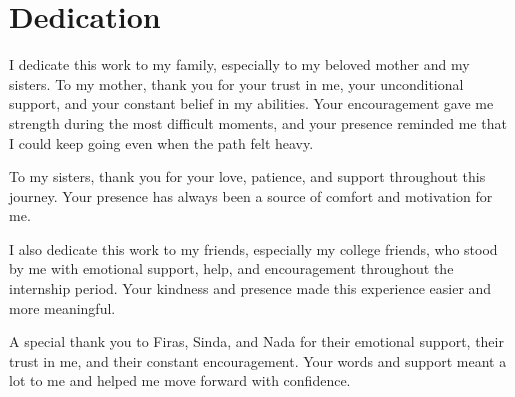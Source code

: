 \section*{Dedication}

\vspace{0.5cm}

I dedicate this work to my family, especially to my beloved mother and my sisters.
To my mother, thank you for your trust in me, your unconditional support, and
your constant belief in my abilities. Your encouragement gave me strength during
the most difficult moments, and your presence reminded me that I could keep going
even when the path felt heavy.

To my sisters, thank you for your love, patience, and support throughout this
journey. Your presence has always been a source of comfort and motivation for me.

I also dedicate this work to my friends, especially my college friends, who stood
by me with emotional support, help, and encouragement throughout the internship
period. Your kindness and presence made this experience easier and more meaningful.

A special thank you to Firas, Sinda, and Nada for their emotional support, their
trust in me, and their constant encouragement. Your words and support meant a lot
to me and helped me move forward with confidence.

